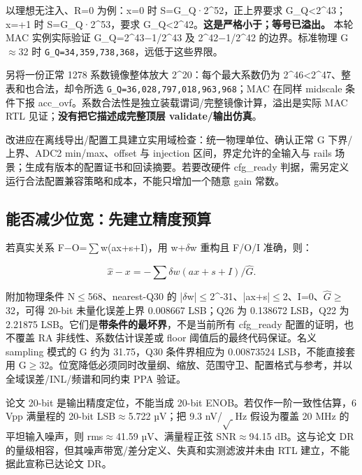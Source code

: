 \documentclass[UTF8,fontset=fandol,10pt,a4paper,openany]{ctexrep}
\newcommand{\code}[1]{\nolinkurl{#1}}
\begin{document}
以理想无注入、R=0 为例：x=0 时 S=G\_Q·2\textasciicircum{}52，正上界要求 G\_Q<2\textasciicircum{}43；x=+1 时 S=G\_Q·2\textasciicircum{}53，要求 G\_Q<2\textasciicircum{}42。\textbf{这是严格小于；等号已溢出。} 本轮 MAC 实例实际验证 G\_Q=2\textasciicircum{}43\ensuremath{-}1/2\textasciicircum{}43 及 2\textasciicircum{}42\ensuremath{-}1/2\textasciicircum{}42 的边界。标准物理 G\ensuremath{\approx}32 时 \code{G_Q=34,359,738,368}，远低于这些界限。


另将一份正常 1278 系数镜像整体放大 2\textasciicircum{}20：每个最大系数仍为 2\textasciicircum{}46<2\textasciicircum{}47、整表和也合法，却令所选 \code{G_Q=36,028,797,018,963,968}；MAC 在同样 midscale 条件下报 acc\_ovf。系数合法性是独立装载谓词/完整镜像计算，溢出是实际 MAC RTL 见证；\textbf{没有把它描述成完整顶层 validate/输出仿真}。


改进应在离线导出/配置工具建立实用域检查：统一物理单位、确认正常 G 下界/上界、ADC2 min/max、offset 与 injection 区间，界定允许的全输入与 rails 场景；生成有版本的配置证书和回读摘要。若要改硬件 cfg\_ready 判据，需另定义运行合法配置兼容策略和成本，不能只增加一个随意 gain 常数。


\subsection{能否减少位宽：先建立精度预算}


若真实关系 F\ensuremath{-}O=\ensuremath{\sum}w(ax+s+I)，用 w+\ensuremath{\delta}w 重构且 F/O/I 准确，则：


\[\hat{x}-x=-\sum\delta w(ax+s+I)/\hat{G}.\]


附加物理条件 N\ensuremath{\le}568、nearest-Q30 的 |\ensuremath{\delta}w|\ensuremath{\le}2\textasciicircum{}-31、|ax+s|\ensuremath{\le}2、I=0、\ensuremath{\hat{G}}\ensuremath{\ge}32，可得 20-bit 未量化误差上界 0.008667 LSB；Q26 为 0.138672 LSB，Q22 为 2.21875 LSB。它们是\textbf{带条件的最坏界}，不是当前所有 cfg\_ready 配置的证明，也不覆盖 RA 非线性、系数估计误差或 floor 阈值后的最终代码保证。名义 sampling 模式的 G 约为 31.75，Q30 条件界相应为 0.00873524 LSB，不能直接套用 G\ensuremath{\ge}32。位宽降低必须同时改量纲、缩放、范围守卫、配置格式与参考，并以全域误差/INL/频谱和同约束 PPA 验证。


论文 20-bit 是输出精度定位，不能当成 20-bit ENOB。若仅作一阶一致性估算，6 Vpp 满量程的 20-bit LSB\ensuremath{\approx}5.722 µV；把 9.3 nV/\ensuremath{\sqrt{\;}}Hz 假设为覆盖 20 MHz 的平坦输入噪声，则 rms\ensuremath{\approx}41.59 µV、满量程正弦 SNR\ensuremath{\approx}94.15 dB。这与论文 DR 的量级相容，但其噪声带宽/差分定义、失真和实测滤波并未由 RTL 建立，不能据此宣称已达论文 DR。
\end{document}
